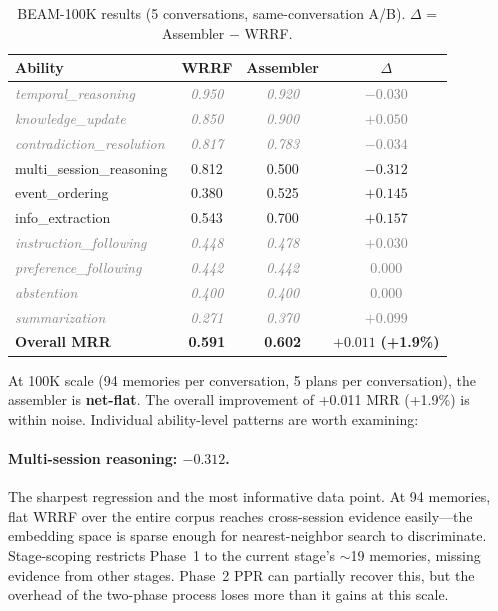 \documentclass[11pt]{article}
\newcommand{\graynoise}[1]{\textcolor{gray}{\textit{#1}}}
\begin{document}
\begin{table}[t]
\centering
\caption{BEAM-100K results (5 conversations, same-conversation A/B).
  $\Delta$ = Assembler $-$ WRRF.}
\label{tab:100k}
\begin{tabular}{lccc}
\toprule
Ability & WRRF & Assembler & $\Delta$ \\
\midrule
\graynoise{temporal\_reasoning} & \graynoise{0.950} & \graynoise{0.920} & \graynoise{$-0.030$} \\
\graynoise{knowledge\_update} & \graynoise{0.850} & \graynoise{0.900} & \graynoise{$+0.050$} \\
\graynoise{contradiction\_resolution} & \graynoise{0.817} & \graynoise{0.783} & \graynoise{$-0.034$} \\
multi\_session\_reasoning & 0.812 & 0.500 & $\mathbf{-0.312}$ \\
event\_ordering & 0.380 & 0.525 & $\mathbf{+0.145}$ \\
info\_extraction & 0.543 & 0.700 & $\mathbf{+0.157}$ \\
\graynoise{instruction\_following} & \graynoise{0.448} & \graynoise{0.478} & \graynoise{$+0.030$} \\
\graynoise{preference\_following} & \graynoise{0.442} & \graynoise{0.442} & \graynoise{$0.000$} \\
\graynoise{abstention} & \graynoise{0.400} & \graynoise{0.400} & \graynoise{$0.000$} \\
\graynoise{summarization} & \graynoise{0.271} & \graynoise{0.370} & \graynoise{$+0.099$} \\
\midrule
\textbf{Overall MRR} & \textbf{0.591} & \textbf{0.602} & $\mathbf{+0.011}$ \textbf{(+1.9\%)} \\
\bottomrule
\end{tabular}
\end{table}

At 100K scale (94 memories per conversation, 5 plans per
conversation), the assembler is \textbf{net-flat}.  The overall
improvement of +0.011 MRR (+1.9\%) is within noise.  Individual
ability-level patterns are worth examining:

\paragraph{Multi-session reasoning: $-0.312$.}
The sharpest regression and the most informative data point.  At 94
memories, flat WRRF over the entire corpus reaches cross-session
evidence easily---the embedding space is sparse enough for
nearest-neighbor search to discriminate.  Stage-scoping restricts
Phase~1 to the current stage's $\sim$19 memories, missing evidence
from other stages.  Phase~2 PPR can partially recover this, but the
overhead of the two-phase process loses more than it gains at this
scale.
\end{document}
